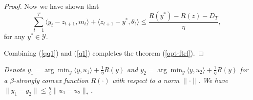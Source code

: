 \documentclass[final,12pt]{colt2018} %
\newcommand{\YY}{\mathcal{Y}}
\newcommand{\pr}[1]{\left(#1\right)}
\begin{document}
\begin{proof}
Now we have shown that 
\begin{equation} \label{q1}
\sum_{t=1}^{T}  \langle y_t - z_{t+1} , m_t \rangle + \langle z_{t+1} - y^*, \theta_t \rangle
\leq \frac{ R(y^*) - R(z) - D_{T} }{\eta},
\end{equation}
for any $y^* \in \YY$.
%

Combining (\ref{qq1}) and (\ref{q1}) completes the theorem (\ref{opt-ftrl}).


\end{proof}


\begin{lemma} \label{aux:optFTRL}
\textit{
Denote $y_1 = \arg\min_{y} \langle y, u_1 \rangle + \frac{1}{\eta} R(y)$
and $y_{2} = \arg\min_{y} \langle y, u_2 \rangle + \frac{1}{\eta} R(y)$
for a $\beta$-strongly convex function $R(\cdot)$ with respect to a norm $\| \cdot \|$.
We have $\| y_{1} - y_{2} \| \leq \frac{\eta}{\beta} \| u_1 - u_2\|_{*}$.} 
\end{lemma}
\end{document}
